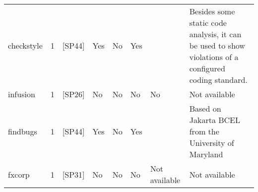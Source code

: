 \begin{tabular}{lrllllll}
          checkstyle &      1 &                                                 [SP44] &   Yes &       No &       Yes &                                                                                                                                                                                         &                                                                                                                                                                                                                                                                                                            Besides some static code analysis, it can be used to show violations of a configured coding standard. \\
            infusion &      1 &                                                 [SP26] &    No &       No &        No &                                                                                                                                                                                      No &                                                                                                                                                                                                                                                                                                                                                                                                    Not available \\
            findbugs &      1 &                                                 [SP44] &   Yes &       No &       Yes &                                                                                                                                                                                         &                                                                                                                                                                                                                                                                                                                                                            Based on Jakarta BCEL from the University of Maryland \\
              fxcorp &      1 &                                                 [SP31] &    No &       No &        No &                                                                                                                                                                           Not available &                                                                                                                                                                                                                                                                                                                                                                                                    Not available \\

\end{tabular}
